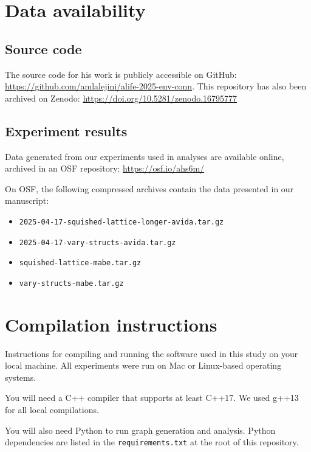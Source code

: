 \documentclass[
]{book}
\providecommand{\tightlist}{%
  \setlength{\itemsep}{0pt}\setlength{\parskip}{0pt}}
\begin{document}
\hypertarget{data-availability}{%
\chapter{Data availability}\label{data-availability}}

\hypertarget{source-code}{%
\section{Source code}\label{source-code}}

The source code for his work is publicly accessible on GitHub: \url{https://github.com/amlalejini/alife-2025-env-conn}.
This repository has also been archived on Zenodo: \url{https://doi.org/10.5281/zenodo.16795777}

\hypertarget{experiment-results}{%
\section{Experiment results}\label{experiment-results}}

Data generated from our experiments used in analyses are available online, archived in an OSF repository: \url{https://osf.io/ahs6m/}

On OSF, the following compressed archives contain the data presented in our manuscript:

\begin{itemize}
\tightlist
\item
  \texttt{2025-04-17-squished-lattice-longer-avida.tar.gz}
\item
  \texttt{2025-04-17-vary-structs-avida.tar.gz}
\item
  \texttt{squished-lattice-mabe.tar.gz}
\item
  \texttt{vary-structs-mabe.tar.gz}
\end{itemize}

\hypertarget{compilation-instructions}{%
\chapter{Compilation instructions}\label{compilation-instructions}}

Instructions for compiling and running the software used in this study on your local machine.
All experiments were run on Mac or Linux-based operating systems.

You will need a C++ compiler that supports at least C++17.
We used g++13 for all local compilations.

You will also need Python to run graph generation and analysis.
Python dependencies are listed in the \texttt{requirements.txt} at the root of this repository.
\end{document}
